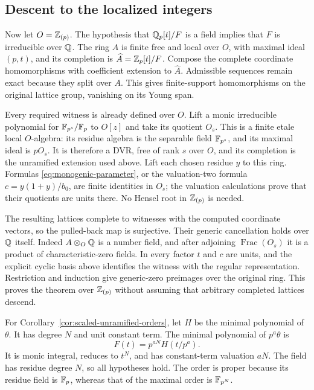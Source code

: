 \subsection{Descent to the localized integers}

Now let $O=\mathbb Z_{(p)}$.  The hypothesis that $\mathbb Q_p[t]/F$ is a field
implies that $F$ is irreducible over $\mathbb Q$.  The ring $A$ is finite
free and local over $O$, with maximal ideal $(p,t)$, and its
completion is $\widehat A=\mathbb Z_p[t]/F$.  Compose the complete
coordinate homomorphisms with coefficient extension to $\widehat A$.
Admissible sequences remain exact because they split over $A$.
This gives finite-support homomorphisms on the original lattice
group, vanishing on its Young span.

Every required witness is already defined over $O$.  Lift a monic
irreducible polynomial for $\mathbb F_{p^s}/\mathbb F_p$ to $O[z]$ and take its
quotient $O_s$.  This is a finite etale local $O$-algebra: its
residue algebra is the separable field $\mathbb F_{p^s}$, and its maximal
ideal is $pO_s$.  It is therefore a DVR, free of rank $s$ over $O$,
and its completion is the unramified extension used above.
Lift each chosen residue $y$ to this ring.  Formulas
\eqref{eq:monogenic-parameter}, or the valuation-two formula
$c=y(1+y)/b_0$, are finite identities in $O_s$; the valuation
calculations prove that their quotients are units there.
No Hensel root in $\mathbb Z_{(p)}$ is needed.

The resulting lattices complete to witnesses with the computed
coordinate vectors, so the pulled-back map is surjective.
Their generic cancellation holds over $\mathbb Q$ itself.  Indeed
$A\otimes_O\mathbb Q$ is a number field, and after adjoining
$\operatorname{Frac}(O_s)$ it is a product of characteristic-zero
fields.  In every factor $t$ and $c$ are units, and the explicit
cyclic basis above identifies the witness with the regular
representation.  Restriction and induction give generic-zero
preimages over the original ring.  This proves the theorem over
$\mathbb Z_{(p)}$ without assuming that arbitrary completed lattices descend.

For Corollary~\ref{cor:scaled-unramified-orders}, let $H$ be the
minimal polynomial of $\theta$.  It has degree $N$ and unit constant
term.  The minimal polynomial of $p^a\theta$ is
\[
 F(t)=p^{aN}H(t/p^a).
\]
It is monic integral, reduces to $t^N$, and has constant-term
valuation $aN$.  The field has residue degree $N$, so all hypotheses
hold.  The order is proper because its residue
field is $\mathbb F_p$, whereas that of the maximal order is $\mathbb F_{p^N}$.

